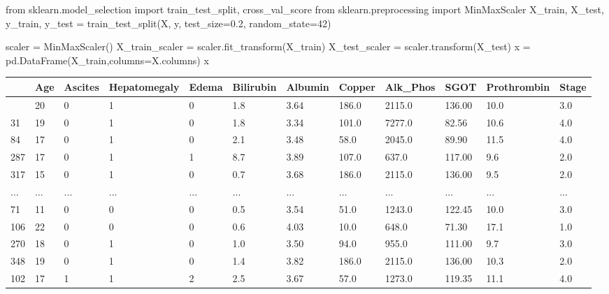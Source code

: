 \documentclass[
  letterpaper,
]{krantz}
\makeatletter
\newenvironment{Shaded}{\begin{snugshade}}{\end{snugshade}}
\newcommand{\DecValTok}[1]{\textcolor[rgb]{0.68,0.00,0.00}{#1}}
\newcommand{\FloatTok}[1]{\textcolor[rgb]{0.68,0.00,0.00}{#1}}
\newcommand{\ImportTok}[1]{\textcolor[rgb]{0.00,0.46,0.62}{#1}}
\newcommand{\NormalTok}[1]{\textcolor[rgb]{0.00,0.23,0.31}{#1}}
\newcommand{\OperatorTok}[1]{\textcolor[rgb]{0.37,0.37,0.37}{#1}}
\newenvironment{kframe}{%
\medskip{}
\setlength{\fboxsep}{.8em}
 \def\at@end@of@kframe{}%
 \ifinner\ifhmode%
  \def\at@end@of@kframe{\end{minipage}}%
  \begin{minipage}{\columnwidth}%
 \fi\fi%
 \def\FrameCommand##1{\hskip\@totalleftmargin \hskip-\fboxsep
 \colorbox{shadecolor}{##1}\hskip-\fboxsep
     \hskip-\linewidth \hskip-\@totalleftmargin \hskip\columnwidth}%
 \MakeFramed {\advance\hsize-\width
   \@totalleftmargin\z@ \linewidth\hsize
   \@setminipage}}%
 {\par\unskip\endMakeFramed%
 \at@end@of@kframe}
\renewenvironment{Shaded}{\begin{kframe}}{\end{kframe}}
\makeatother
\begin{document}
\begin{Shaded}
\begin{Highlighting}[]
\ImportTok{from}\NormalTok{ sklearn.model\_selection }\ImportTok{import}\NormalTok{ train\_test\_split, cross\_val\_score}
\ImportTok{from}\NormalTok{ sklearn.preprocessing }\ImportTok{import}\NormalTok{ MinMaxScaler}
\NormalTok{X\_train, X\_test, y\_train, y\_test }\OperatorTok{=}\NormalTok{ train\_test\_split(X, y, test\_size}\OperatorTok{=}\FloatTok{0.2}\NormalTok{, random\_state}\OperatorTok{=}\DecValTok{42}\NormalTok{)}

\NormalTok{scaler }\OperatorTok{=}\NormalTok{ MinMaxScaler()}
\NormalTok{X\_train\_scaler }\OperatorTok{=}\NormalTok{ scaler.fit\_transform(X\_train)}
\NormalTok{X\_test\_scaler }\OperatorTok{=}\NormalTok{ scaler.transform(X\_test)}
\NormalTok{x }\OperatorTok{=}\NormalTok{ pd.DataFrame(X\_train,columns}\OperatorTok{=}\NormalTok{X.columns)}
\NormalTok{x}
\end{Highlighting}
\end{Shaded}

\begin{longtable}[]{@{}llllllllllll@{}}
\toprule\noalign{}
& Age & Ascites & Hepatomegaly & Edema & Bilirubin & Albumin & Copper &
Alk\_Phos & SGOT & Prothrombin & Stage \\
\midrule\noalign{}
\endhead
\bottomrule\noalign{}
\endlastfoot
336 & 20 & 0 & 1 & 0 & 1.8 & 3.64 & 186.0 & 2115.0 & 136.00 & 10.0 &
3.0 \\
31 & 19 & 0 & 1 & 0 & 1.8 & 3.34 & 101.0 & 7277.0 & 82.56 & 10.6 &
4.0 \\
84 & 17 & 0 & 1 & 0 & 2.1 & 3.48 & 58.0 & 2045.0 & 89.90 & 11.5 & 4.0 \\
287 & 17 & 0 & 1 & 1 & 8.7 & 3.89 & 107.0 & 637.0 & 117.00 & 9.6 &
2.0 \\
317 & 15 & 0 & 1 & 0 & 0.7 & 3.68 & 186.0 & 2115.0 & 136.00 & 9.5 &
2.0 \\
... & ... & ... & ... & ... & ... & ... & ... & ... & ... & ... & ... \\
71 & 11 & 0 & 0 & 0 & 0.5 & 3.54 & 51.0 & 1243.0 & 122.45 & 10.0 &
3.0 \\
106 & 22 & 0 & 0 & 0 & 0.6 & 4.03 & 10.0 & 648.0 & 71.30 & 17.1 & 1.0 \\
270 & 18 & 0 & 1 & 0 & 1.0 & 3.50 & 94.0 & 955.0 & 111.00 & 9.7 & 3.0 \\
348 & 19 & 0 & 1 & 0 & 1.4 & 3.82 & 186.0 & 2115.0 & 136.00 & 10.3 &
2.0 \\
102 & 17 & 1 & 1 & 2 & 2.5 & 3.67 & 57.0 & 1273.0 & 119.35 & 11.1 &
4.0 \\
\end{longtable}
\end{document}
